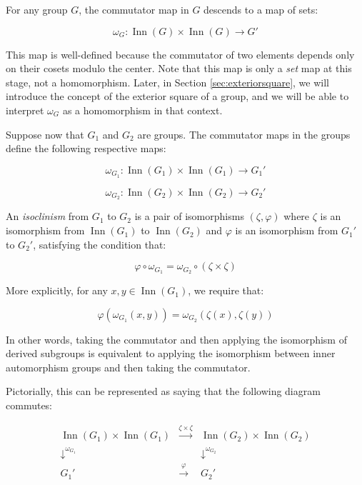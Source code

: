 For any group $G$, the commutator map in $G$ descends to a map of sets:

$$\omega_G: \operatorname{Inn}(G) \times \operatorname{Inn}(G) \to G'$$

This map is well-defined because the commutator of two elements
depends only on their cosets modulo the center. Note that this map is
only a {\em set} map at this stage, not a homomorphism. Later, in
Section \ref{sec:exteriorsquare}, we will introduce the concept of the
exterior square of a group, and we will be able to interpret
$\omega_G$ as a homomorphism in that context.

Suppose now that $G_1$ and $G_2$ are groups. The commutator maps in
the groups define the following respective maps:

$$\omega_{G_1}: \operatorname{Inn}(G_1) \times \operatorname{Inn}(G_1) \to G_1'$$

$$\omega_{G_2}: \operatorname{Inn}(G_2) \times \operatorname{Inn}(G_2) \to G_2'$$

An {\em isoclinism} from $G_1$ to $G_2$ is a pair of isomorphisms
$(\zeta,\varphi)$ where $\zeta$ is an isomorphism from
$\operatorname{Inn}(G_1)$ to $\operatorname{Inn}(G_2)$ and $\varphi$ is an
isomorphism from $G_1'$ to $G_2'$, satisfying the condition that:

\begin{equation}\label{eq:homoclinism-point-free}
  \varphi \circ \omega_{G_1} = \omega_{G_2} \circ (\zeta \times \zeta)
\end{equation}

More explicitly, for any $x,y \in \operatorname{Inn}(G_1)$, we require that:

\begin{equation}\label{eq:homoclinism-pointed}
  \varphi(\omega_{G_1}(x,y)) = \omega_{G_2}(\zeta(x),\zeta(y))
\end{equation}

In other words, taking the commutator and then applying the
isomorphism of derived subgroups is equivalent to applying the
isomorphism between inner automorphism groups and then taking the
commutator.

Pictorially, this can be represented as saying that the following
diagram commutes:

$$\begin{array}{ccc}
  \operatorname{Inn}(G_1) \times \operatorname{Inn}(G_1) & \stackrel{\zeta \times \zeta}{\to} & \operatorname{Inn}(G_2) \times \operatorname{Inn}(G_2) \\
  \downarrow^{\omega_{G_1}}  & & \downarrow^{\omega_{G_2}}\\
  G_1' & \stackrel{\varphi}{\to} & G_2'\\
\end{array}$$

